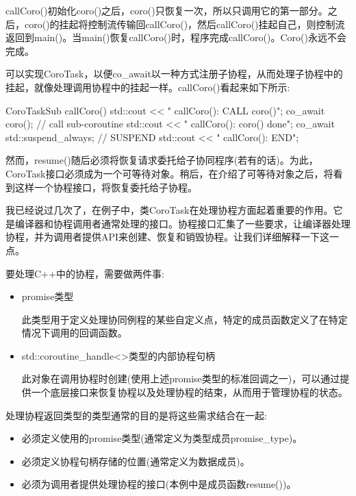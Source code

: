 callCoro()初始化coro()之后，coro()只恢复一次，所以只调用它的第一部分。之后，coro()的挂起将控制流传输回callCoro()，然后callCoro()挂起自己，则控制流返回到main()。当main()恢复callCoro()时，程序完成callCoro()。Coro()永远不会完成。


可以实现CoroTask，以便co\_await以一种方式注册子协程，从而处理子协程中的挂起，就像处理调用协程中的挂起一样。callCoro()看起来如下所示:

\begin{cpp}
CoroTaskSub callCoro()
{
	std::cout << " callCoro(): CALL coro()\n";
	co_await coro(); // call sub-coroutine
	std::cout << " callCoro(): coro() done\n";
	co_await std::suspend_always{}; // SUSPEND
	std::cout << " callCoro(): END\n";
}
\end{cpp}

然而，resume()随后必须将恢复请求委托给子协同程序(若有的话)。为此，CoroTask接口必须成为一个可等待对象。稍后，在介绍了可等待对象之后，将看到这样一个协程接口，将恢复委托给子协程。


我已经说过几次了，在例子中，类CoroTask在处理协程方面起着重要的作用。它是编译器和协程调用者通常处理的接口。协程接口汇集了一些要求，让编译器处理协程，并为调用者提供API来创建、恢复和销毁协程。让我们详细解释一下这一点。

要处理C++中的协程，需要做两件事:

\begin{itemize}
\item 
promise类型

此类型用于定义处理协同例程的某些自定义点，特定的成员函数定义了在特定情况下调用的回调函数。

\item 
std::coroutine\_handle<>类型的内部协程句柄

此对象在调用协程时创建(使用上述promise类型的标准回调之一)，可以通过提供一个底层接口来恢复协程以及处理协程的结束，从而用于管理协程的状态。
\end{itemize}

处理协程返回类型的类型通常的目的是将这些需求结合在一起:

\begin{itemize}
\item 
必须定义使用的promise类型(通常定义为类型成员promise\_type)。

\item 
必须定义协程句柄存储的位置(通常定义为数据成员)。

\item 
必须为调用者提供处理协程的接口(本例中是成员函数resume())。
\end{itemize}

